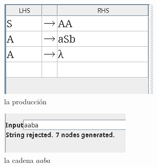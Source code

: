 \documentclass{article}
\begin{document}
\begin{flushleft}
\begin{enumerate}
                \begin{figure}[h] 
                    \centering
                    \begin{subfigure}[b]{0.45\textwidth}
                        \centering
                        \includegraphics[width=\textwidth]{./Imagenes/produccion3.png}
                        \caption{la producción}
                        \label{fig:label10}
                    \end{subfigure}
                    \hfill
                    \begin{subfigure}[b]{0.45\textwidth}
                        \centering
                        \includegraphics[width=\textwidth]{./Imagenes/grafo6.png}
                        \caption{la cadena $aaba$}
                        \label{fig:label11}
                    \end{subfigure}
                    \vspace{0.5cm} 
                    \\
                    \begin{subfigure}[b]{0.45\textwidth}
                        \centering

\end{subfigure}
\end{figure}
\end{enumerate}
\end{flushleft}
\end{document}
